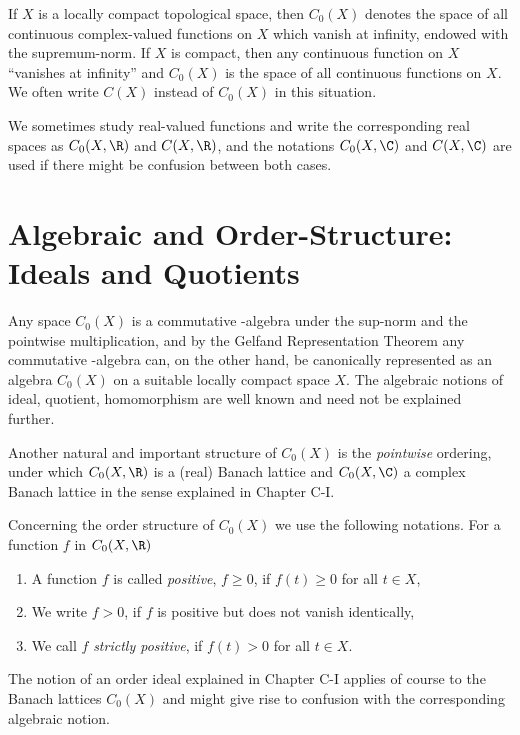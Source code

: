 If $X$ is a locally compact topological space, then $C_{0}(X)$ denotes the space of all continuous complex-valued functions on $X$ which vanish at infinity, endowed with the supremum-norm.
If $X$ is compact, then any continuous function on $X$ \enquote{vanishes at infinity} and $C_{0}(X)$ is the space of all continuous functions on $X$.
We often write $C(X)$ instead of $C_{0}(X)$ in this situation.

We sometimes study real-valued functions and write the corresponding real spaces as $C_{0}(X,\R)$ and 
$C(X,\R)$, and the notations $C_{0}(X,\C)$ and $C(X,\C)$ are used if there might be confusion between both cases.
\section{Algebraic and Order-Structure: Ideals and Quotients}\label{sec:b1-1.1}
Any space $C_{0}(X)$ is a commutative \CA-algebra under the sup-norm and the pointwise multiplication, and by the Gelfand Representation Theorem any commutative \CA-algebra can, on the other hand, be canonically represented as an algebra $C_{0}(X)$ on a suitable locally compact space $X$.
The algebraic notions of ideal, quotient, homomorphism are well known and need not be explained further.

Another natural and important structure of $C_{0}(X)$ is the \emph{pointwise} ordering, under which $C_{0}(X,\R)$ is a (real) Banach lattice and $C_{0}(X,\C)$ a complex Banach lattice in the sense explained in Chapter C-I.

Concerning the order structure of $C_{0}(X)$ we use the following notations.
For a function $f$ in $C_{0}(X,\R)$
\begin{enumerate}[label=]
\item
A function $ f $ is called \emph{positive}, $ f \geq 0 $, if $ f(t) \geq 0  $ for all $ t \in X $, 

\item
We write $  f > 0 $, if $ f $ is positive but does not vanish identically,

\item
We call $ f $ \emph{strictly positive}, if $ f(t) > 0 $ for all $ t \in X $.

\end{enumerate}
The notion of an order ideal explained in Chapter C-I applies of course to the Banach lattices $C_{0}(X)$ and might give rise to confusion with the corresponding algebraic notion.

